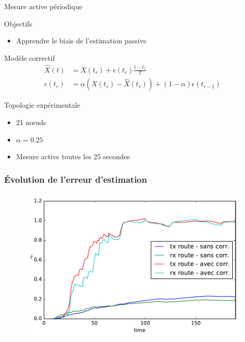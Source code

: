 \begin{frame}{Mesure active périodique}
  \begin{block}{Objectifs}
    \begin{itemize}
      \item Apprendre le biais de l'estimation passive
    \end{itemize}
  \end{block}
  \begin{alertblock}{Modèle correctif}
    \begin{align}
      \widehat{X}(t) &= X(t_r) + \epsilon(t_r)\frac{t - t_r}{T}\\
      \epsilon(t_r) &= \alpha (X(t_r) - \widehat{X}(t_r)) + (1 - \alpha)\epsilon(t_{r-1})
      \label{supervision:eqn:bias}
    \end{align}
  \end{alertblock}
  \begin{block}{Topologie expérimentale}
    \begin{itemize}
      \item 21 nœuds
      \item $\alpha = 0.25$
      \item Mesure active toutes les 25 secondes
    \end{itemize}
  \end{block}
\end{frame}

\begin{frame}\frametitle{Évolution de l'erreur d'estimation}
  \begin{figure}[ht]
    \centering
    \includegraphics[width=\textwidth]{figures/mesure_active.pdf}
  \end{figure}
\end{frame}



